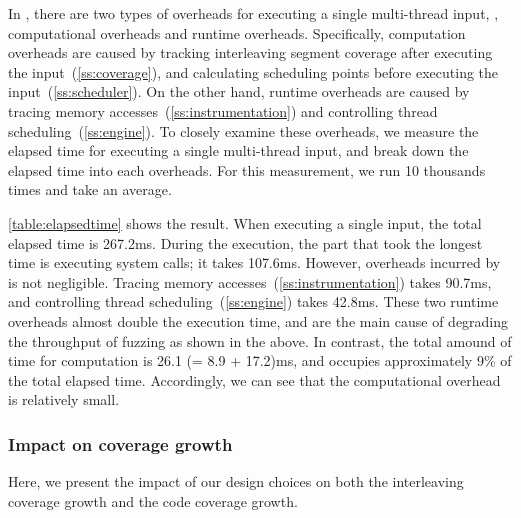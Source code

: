 %
\begin{table}[t]
  \centering
  
  \caption{
    Elapsed time (ms) for executing one multi-thread input. We
    decompose the elapsed time into the system call execution
    (\texttt{Exec. syscall}), \sys's computational overheads
    (\texttt{Comp. overhead}) and runtime overhead (\texttt{Runtime
      overhead}).}
  \label{table:elapsedtime}
  \vspace{-8pt}
\end{table}
%
In \sys, there are two types of overheads for executing a single
multi-thread input, \ie, computational overheads and runtime
overheads.
%
Specifically, computation overheads are caused by tracking
interleaving segment coverage after executing the
input~(\autoref{ss:coverage}), and calculating scheduling points
before executing the input~(\autoref{ss:scheduler}).
%
On the other hand, runtime overheads are caused by tracing memory
accesses~(\autoref{ss:instrumentation}) and controlling thread
scheduling~(\autoref{ss:engine}).
%
To closely examine these overheads, we measure the elapsed time for
executing a single multi-thread input, and break down the elapsed time
into each overheads.
%
For this measurement, we run 10 thousands times and take an average.




\autoref{table:elapsedtime} shows the result. When executing a single
input, the total elapsed time is 267.2ms.
%
During the execution, the part that took the longest time is executing
system calls; it takes 107.6ms.
%
However, overheads incurred by \sys is not negligible. Tracing memory
accesses~(\autoref{ss:instrumentation}) takes 90.7ms, and controlling
thread scheduling~(\autoref{ss:engine}) takes 42.8ms. These two
runtime overheads almost double the execution time, and are the main
cause of degrading the throughput of fuzzing as shown in the above.
%
In contrast, the total amound of time for computation is 26.1 (= 8.9 +
17.2)ms, and occupies approximately 9\% of the total elapsed time.
%
Accordingly, we can see that the computational overhead is relatively
small.



\subsubsection{Impact on coverage growth}
\label{sss:component}
%
Here, we present the impact of our design choices on both the
interleaving coverage growth and the code coverage growth.


